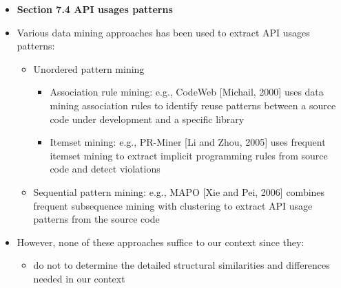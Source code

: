 \documentclass{article}
\newcommand{\bold}{\textbf}
\begin{document}
\begin{itemize} [leftmargin=.1in]
\item \bold{Section 7.4 API usages patterns}
\item Various data mining approaches has been used to extract API usages patterns:
\begin{itemize}
\item Unordered pattern mining
\begin{itemize}
\item Association rule mining: e.g., CodeWeb [Michail, 2000] uses data mining association rules to identify reuse patterns between a source code under development and a specific library
\item Itemset mining: e.g., PR-Miner [Li and Zhou, 2005] uses frequent itemset mining to extract implicit programming rules from source code and detect violations
\end{itemize}
\item Sequential pattern mining: e.g., MAPO [Xie and Pei, 2006] combines frequent subsequence mining with clustering to extract API usage patterns from the source code
\end{itemize}
\item However, none of these approaches suffice to our context since they:
\begin{itemize}
\item do not to determine the detailed structural similarities and differences needed in our context
\end{itemize}



\end{itemize}
\end{document}
